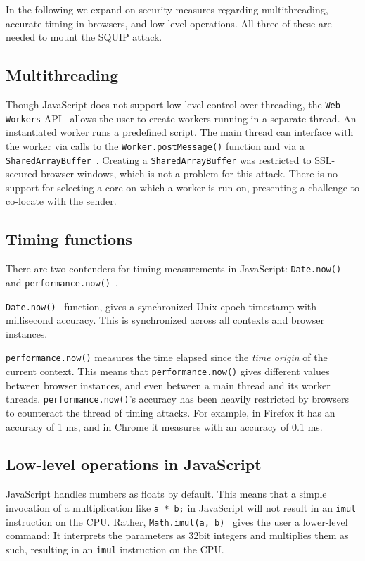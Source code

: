 \documentclass[11pt,
  titlepage=false,
]{scrreprt}
\begin{document}
In the following we expand on security measures regarding multithreading, accurate timing in browsers, and low-level operations.
All three of these are needed to mount the SQUIP attack.

\subsection{Multithreading}\label{subsec:multithreading}
Though JavaScript does not support low-level control over threading, the \texttt{Web Workers} API~\cite{webworkers} allows the user to create workers running in a separate thread.
An instantiated worker runs a predefined script.
The main thread can interface with the worker via calls to the \texttt{Worker.postMessage()} function and via a \texttt{SharedArrayBuffer}~\cite{sharedarraybuffer}.
Creating a \texttt{SharedArrayBuffer} was restricted to SSL-secured browser windows, which is not a problem for this attack.
There is no support for selecting a core on which a worker is run on, presenting a challenge to co-locate with the sender.



\subsection{Timing functions}\label{subsec:timingjs}
There are two contenders for timing measurements in JavaScript: \texttt{Date.now()}~\cite{datenow} and \texttt{performance.now()}~\cite{performancenow}.

\texttt{Date.now()}~\cite{datenow} function, gives a synchronized Unix epoch timestamp with millisecond accuracy.
This is synchronized across all contexts and browser instances.

\texttt{performance.now()} measures the time elapsed since the \textit{time origin} of the current context.
This means that \texttt{performance.now()} gives different values between browser instances, and even between a main thread and its worker threads.
\texttt{performance.now()}'s accuracy has been heavily restricted by browsers to counteract the thread of timing attacks.
For example, in Firefox it has an accuracy of 1 ms, and in Chrome it measures with an accuracy of 0.1 ms.


\subsection{Low-level operations in JavaScript}\label{subsec:lowleveljs}
JavaScript handles numbers as floats by default.
This means that a simple invocation of a multiplication like \texttt{a * b;} in JavaScript will not result in an \texttt{imul} instruction on the CPU.
Rather, \texttt{Math.imul(a, b)}~\cite{mathimul} gives the user a lower-level command:
It interprets the parameters as 32bit integers and multiplies them as such, resulting in an \texttt{imul} instruction on the CPU.
\end{document}

